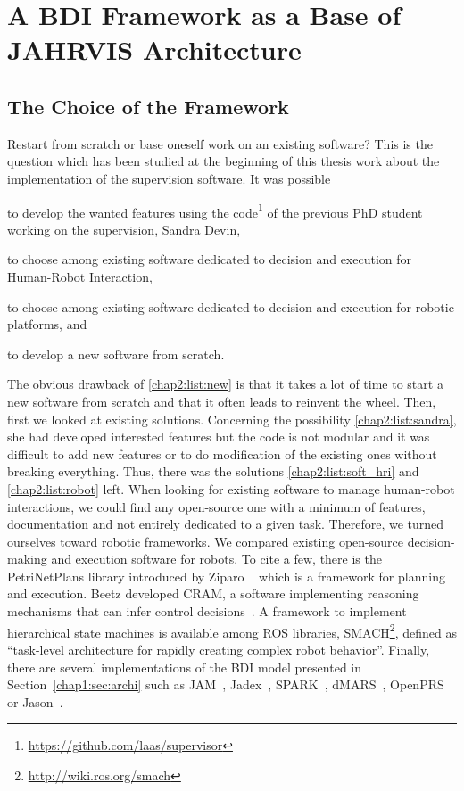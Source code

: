 \documentclass[a4paper,11pt,twoside]{StyleThese}
\begin{document}
\section{A BDI Framework as a Base of JAHRVIS Architecture}


\subsection{The Choice of the Framework}
Restart from scratch or base oneself work on an existing software? This is the question which has been studied at the beginning of this thesis work about the implementation of the supervision software. It was possible 
\begin{enumerate*}[label={(\arabic*)}]
	\item to develop the wanted features using the code\footnote{\url{https://github.com/laas/supervisor}} of the previous PhD student working on the supervision, Sandra Devin,\label{chap2:list:sandra}
	\item to choose among existing software dedicated to decision and execution for Human-Robot Interaction,\label{chap2:list:soft_hri}
	\item to choose among existing software dedicated to decision and execution for robotic platforms, and\label{chap2:list:robot}
	\item to develop a new software from scratch.\label{chap2:list:new}
\end{enumerate*}

The obvious drawback of \ref{chap2:list:new} is that it takes a lot of time to start a new software from scratch and that it often leads to reinvent the wheel. Then, first we looked at existing solutions. Concerning the possibility \ref{chap2:list:sandra}, she had developed interested features but the code is not modular and it was difficult to add new features or to do modification of the existing ones without breaking everything. Thus, there was the solutions \ref{chap2:list:soft_hri} and \ref{chap2:list:robot} left. When looking for existing software to manage human-robot interactions, we could find any open-source one with a minimum of features, documentation and not entirely dedicated to a given task. Therefore, we turned ourselves toward robotic frameworks. We compared existing open-source decision-making and execution software for robots. To cite a few, there is the PetriNetPlans library introduced by Ziparo \etal~\cite{ziparo_2011_petri} which is a framework for planning and execution. Beetz \etal{} developed CRAM, a software implementing reasoning mechanisms that can infer control decisions~\cite{beetz_2010_cram}. A framework to implement hierarchical state machines is available among ROS libraries, SMACH\footnote{\url{http://wiki.ros.org/smach}}, defined as ``task-level architecture for rapidly creating complex robot behavior''. Finally, there are several implementations of the BDI model presented in Section~\ref{chap1:sec:archi} such as JAM~\cite{huber_1999_jam}, Jadex~\cite{braudach_2005_jadex}, SPARK~\cite{morley_2004_spark}, dMARS~\cite{dinverno_1998_formal}, OpenPRS~\cite{ingrand_1996_prs} or Jason~\cite{bordini_2007_jason}. 
\end{document}
